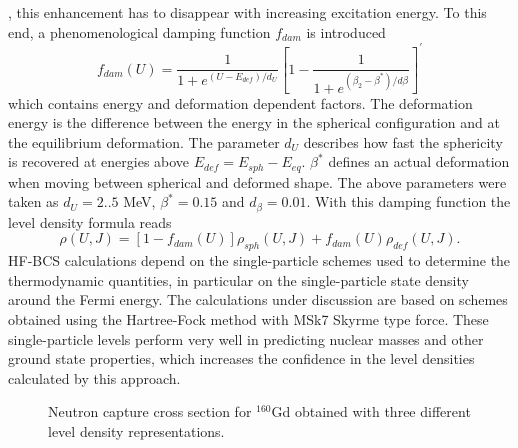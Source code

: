 , this enhancement has to disappear with increasing
excitation energy. To this end, a phenomenological damping function $f_{dam}$
is introduced
\begin{equation}
f_{dam}(U)=%
\frac{1}{1+e^{(U-E_{def})/d_{U}}}\left[1-\frac{1}{1+e^{(\beta_{2}-%
\beta^{*})/d\beta}}\right]^{\prime}  \label{dampgor}
\end{equation}
which contains energy and deformation dependent factors. The deformation
energy is the difference between the energy in the spherical configuration
and at the equilibrium deformation. The parameter $d_{U}$ describes how fast
the sphericity is recovered at energies above $E_{def}=E_{sph}-E_{eq}$. $%
\beta^{*}$ defines an actual deformation when moving between spherical and
deformed shape. The above parameters were taken as $d_{U}=2..5$ MeV, $%
\beta^{*}=0.15$ and $d_{\beta}=0.01$. With this damping function the level
density%
 formula reads
\begin{equation}
\rho(U,J)=\left[1-f_{dam}(U)\right]\rho_{sph}(U,J)+f_{dam}(U)\rho_{def}(U,J).
\label{rogor}
\end{equation}
HF-BCS%
 calculations depend on the single-particle schemes used to
determine the thermodynamic quantities, in particular on the single-particle
state density around the Fermi energy. The calculations under discussion are
based on schemes obtained using the Hartree-Fock method with MSk7 Skyrme
type force. These single-particle levels perform very well in predicting
nuclear masses and other ground state properties, which increases the
confidence in the level densities%
 calculated by this approach.
\begin{figure}[htbp]
\caption{Neutron capture cross section for $^{160}$Gd obtained with three
different level density representations.}
\label{levdens}
\end{figure}

